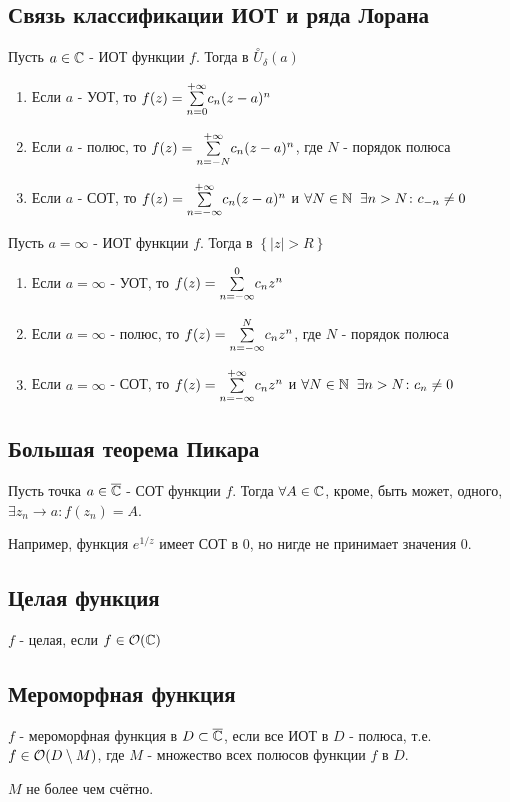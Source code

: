 \subsection{Связь классификации ИОТ и ряда Лорана}
\begin{theorem}
  Пусть $a\in\C$ - ИОТ функции $f$. Тогда в $\overset{\circ}{U}_\delta(a)$
  \begin{enumerate}
    \item Если $a$ - УОТ, то $f(z) = \Sum{n=0}{+\infty}c_n(z-a)^n$
    \item Если $a$ - полюс, то $f(z) = \Sum{n=-N}{+\infty}c_n(z-a)^n$, где $N$ - порядок полюса
    \item Если $a$ - СОТ, то $f(z) = \Sum{n=-\infty}{+\infty}c_n(z-a)^n$ и $\forall N\in\N\q \exists n>N\colon c_{-n}\neq 0$
  \end{enumerate}

  Пусть $a=\infty$ - ИОТ функции $f$. Тогда в $\left\{|z|>R\right\}$
  \begin{enumerate}
    \item Если $a = \infty$ - УОТ, то $f(z) = \Sum{n=-\infty}{0}c_nz^n$
    \item Если $a = \infty$ - полюс, то $f(z) = \Sum{n=-\infty}{N}c_nz^n$, где $N$ - порядок полюса
    \item Если $a = \infty$ - СОТ, то $f(z) = \Sum{n=-\infty}{+\infty}c_nz^n$ и $\forall N\in\N\q \exists n>N\colon c_n\neq 0$ 
  \end{enumerate}
\end{theorem}
\subsection{Большая теорема Пикара}
\begin{theorem}
  Пусть точка $a\in\overline{\C}$ - СОТ функции $f$. Тогда $\forall A\in\C$, кроме, быть может, одного, $\exists z_n\to a\colon f(z_n) = A$.
\end{theorem}
Например, функция $e^{1/z}$ имеет СОТ в 0, но нигде не принимает значения 0. 
\subsection{Целая функция}
\begin{definition}
  $f$ - целая, если $f\in\O(\C)$
\end{definition}
\subsection{Мероморфная функция}
\begin{definition}
  $f$ - мероморфная функция в $D\subset \overline{\C}$, если все ИОТ в $D$ - полюса, т.е. \\$f\in\O(D\setminus M)$, где $M$ - множество всех полюсов функции $f$ в $D$.

  $M$ не более чем счётно. 
\end{definition}
